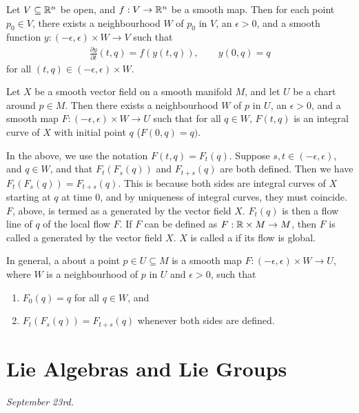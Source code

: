 \begin{theorem}
    Let $V \subseteq \mathbb{R}^{n}$ be open, and $f:V \to \mathbb{R}^{n}$ be a smooth map. Then for each point $p_{0} \in V$, there exists a neighbourhood $W$ of $p_{0}$ in $V$, an $\epsilon > 0$, and a smooth function $y:(-\epsilon,\epsilon) \times W \to V$ such that
    \begin{align}
        \frac{\partial y}{\partial t}(t,q) = f(y(t,q)), \qquad y(0,q) = q
    \end{align}
    for all $(t,q) \in (-\epsilon,\epsilon) \times W$.
\end{theorem}
\begin{corollary}
    Let $X$ be a smooth vector field on a smooth manifold $M$, and let $U$ be a chart around $p \in M$. Then there exists a neighbourhood $W$ of $p$ in $U$, an $\epsilon > 0$, and a smooth map $F:(-\epsilon,\epsilon) \times W \to U$ such that for all $q \in W$, $F(t,q)$ is an integral curve of $X$ with initial point $q$ ($F(0,q) = q)$.
\end{corollary}
In the above, we use the notation $F(t,q) = F_{t}(q)$. Suppose $s,t \in (-\epsilon,\epsilon)$, and $q \in W$, and that $F_{t}(F_{s}(q))$ and $F_{t+s}(q)$ are both defined. Then we have $F_{t}(F_{s}(q)) = F_{t+s}(q)$. This is because both sides are integral curves of $X$ starting at $q$ at time $0$, and by uniqueness of integral curves, they must coincide. $F$, above, is termed as a  generated by the vector field $X$. $F_{t}(q)$ is then a flow line of $q$ of the local flow $F$. If $F$ can be defined as $F:\mathbb{R} \times M \to M$, then $F$ is called a  generated by the vector field $X$. $X$ is called a  if its flow is global.

\begin{definition}
    In general, a  about a point $p \in U \subseteq M$ is a smooth map $F:(-\epsilon,\epsilon) \times W \to U$, where $W$ is a neighbourhood of $p$ in $U$ and $\epsilon > 0$, such that
    \begin{enumerate}
        \item $F_{0}(q) = q$ for all $q \in W$, and
        \item $F_{t}(F_{s}(q)) = F_{t+s}(q)$ whenever both sides are defined.
    \end{enumerate}
\end{definition}


\section{Lie Algebras and Lie Groups}
\textit{September 23rd.}

